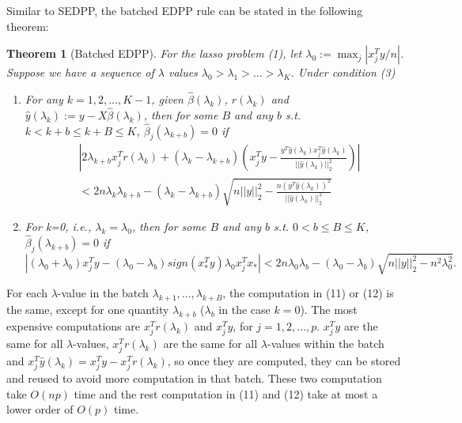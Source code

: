 \documentclass{article}
\newtheorem{theorem}{Theorem}[section]
\begin{document}
Similar to SEDPP, the batched EDPP rule can be stated in the following theorem:

\begin{theorem}[Batched EDPP]
    For the lasso problem (1), let $\lambda_0:=\max_j|x_j^Ty/n|$. Suppose we have a sequence of $\lambda$ values $\lambda_0>\lambda_1>...>\lambda_K$. Under condition (3)
    \begin{enumerate}
        \item For any $k=1,2,...,K-1$, given $\hat{\beta}(\lambda_k)$, $r(\lambda_k)$ and $\hat{y}(\lambda_k):=y-X\hat{\beta}(\lambda_k)$, then for some $B$ and any $b$ s.t. $k<k+b\leq k+B\leq K$, $\hat{\beta}_j(\lambda_{k+b})=0$ if
        \begin{equation}
            \begin{split}
                &\left|2\lambda_{k+b}x_j^Tr(\lambda_k)+(\lambda_k-\lambda_{k+b})\left( x_j^Ty-\frac{y^T\hat{y}(\lambda_k)x_j^T\hat{y}(\lambda_k)}{||\hat{y}(\lambda_k)||_2^2}\right)\right|\\&<2n\lambda_k\lambda_{k+b}-(\lambda_k-\lambda_{k+b})\sqrt{n||y||_2^2-\frac{n(y^T\hat{y}(\lambda_k))^2}{||\hat{y}(\lambda_k)||_2^2}}
            \end{split}
        \end{equation}
        \item For k=0, i.e., $\lambda_k=\lambda_0$, then for some $B$ and any $b$ s.t. $0<b\leq B\leq K$, $\hat{\beta}_j(\lambda_{k+b})=0$ if
        \begin{equation}
        |(\lambda_0+\lambda_b)x_j^Ty-(\lambda_0-\lambda_b)sign(x_*^Ty)\lambda_0x_j^Tx_*|<2n\lambda_0\lambda_b-(\lambda_0-\lambda_b)\sqrt{n||y||_2^2-n^2\lambda_0^2}.
    \end{equation}
    \end{enumerate}
\end{theorem}

For each $\lambda$-value in the batch $\lambda_{k+1},...,\lambda_{k+B}$, the computation in (11) or (12) is the same, except for one quantity $\lambda_{k+b}$ ($\lambda_b$ in the case $k=0$). The most expensive computations are $x_j^Tr(\lambda_k)$ and $x_j^Ty$, for $j=1,2,...,p$. $x_j^Ty$ are the same for all $\lambda$-values, $x_j^Tr(\lambda_k)$ are the same for all $\lambda$-values within the batch and $x_j^T\hat{y}(\lambda_k)=x_j^Ty-x_j^Tr(\lambda_k)$, so once they are computed, they can be stored and reused to avoid more computation in that batch. These two computation take $O(np)$ time and the rest computation in (11) and (12) take at most a lower order of $O(p)$ time.
\end{document}
